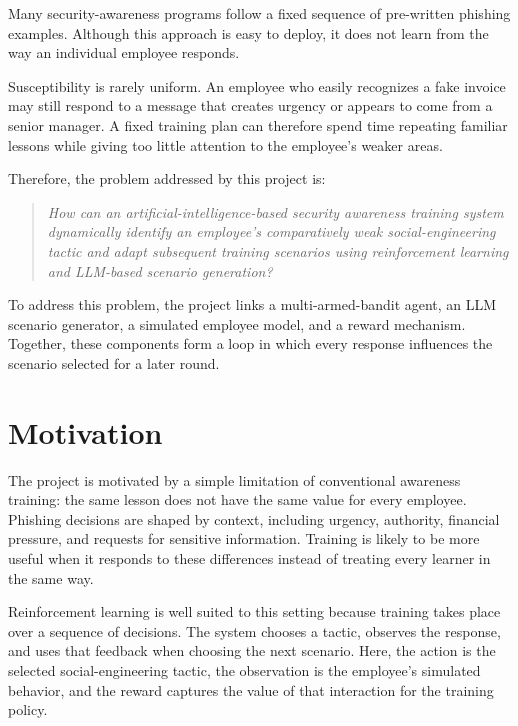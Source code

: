 \documentclass[12pt,a4paper]{article}
\begin{document}
Many security-awareness programs follow a fixed sequence of
pre-written phishing examples. Although this approach is easy to
deploy, it does not learn from the way an individual employee responds.

Susceptibility is rarely uniform. An employee who easily recognizes a
fake invoice may still respond to a message that creates urgency or
appears to come from a senior manager. A fixed training plan can
therefore spend time repeating familiar lessons while giving too little
attention to the employee's weaker areas.

Therefore, the problem addressed by this project is:

\begin{quote}
\textit{How can an artificial-intelligence-based security awareness
training system dynamically identify an employee's comparatively weak
social-engineering tactic and adapt subsequent training scenarios using
reinforcement learning and LLM-based scenario generation?}
\end{quote}

To address this problem, the project links a multi-armed-bandit agent,
an LLM scenario generator, a simulated employee model, and a reward
mechanism. Together, these components form a loop in which every
response influences the scenario selected for a later round.



\section{Motivation}

The project is motivated by a simple limitation of conventional
awareness training: the same lesson does not have the same value for
every employee. Phishing decisions are shaped by context, including
urgency, authority, financial pressure, and requests for sensitive
information. Training is likely to be more useful when it responds to
these differences instead of treating every learner in the same way.

Reinforcement learning is well suited to this setting because training
takes place over a sequence of decisions. The system chooses a tactic,
observes the response, and uses that feedback when choosing the next
scenario. Here, the action is the selected social-engineering tactic,
the observation is the employee's simulated behavior, and the reward
captures the value of that interaction for the training policy.
\end{document}
